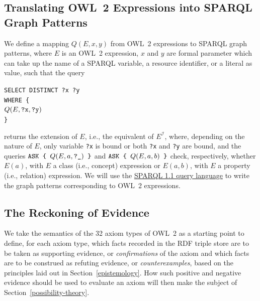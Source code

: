 \documentclass[a4paper]{article}
\newcounter{ex}
\begin{document}
\subsection{Translating OWL~2 Expressions into SPARQL Graph Patterns}

We define a mapping $Q(E, x, y)$ from OWL~2 expressions to SPARQL graph patterns,
where $E$ is an OWL~2 expression, $x$ and $y$ are formal parameter which can take up
the name of a SPARQL variable, a resource identifier, or a literal as value,
such that the query
\begin{tabbing}
\texttt{SELECT DISTINCT ?x ?y} \\
\texttt{WHERE \{}\\
\quad $Q(E, \mbox{\tt ?x}, \mbox{\tt ?y})$\\
\texttt{\}}
\end{tabbing}
returns the extension of $E$, i.e., the equivalent of $E^\mathcal{I}$, where,
depending on the nature of $E$, only variable \texttt{?x}
is bound or both \texttt{?x} and \texttt{?y} are bound,
and the queries $\mbox{\tt ASK \{ } Q(E, a, \mbox{\tt ?\_}) \mbox{\tt\ \}}$ and
$\mbox{\tt ASK \{ } Q(E, a, b) \mbox{\tt\ \}}$
check, respectively, whether $E(a)$, with $E$ a class (i.e., concept) expression or
$E(a, b)$, with $E$ a property (i.e., relation) expression.
We will use the \href{http://www.w3.org/TR/sparql11-query/}{SPARQL 1.1 query language}
to write the graph patterns corresponding to OWL~2 expressions.

\subsection{The Reckoning of Evidence}

We take the semantics of the 32 axiom types of OWL~2 as a starting point to define,
for each axiom type, which facts recorded in the RDF triple store are to be taken as
supporting evidence, or \emph{confirmations} of the axiom and which facts are to be
construed as refuting evidence, or \emph{counterexamples}, based on the principles
laid out in Section~\ref{epistemology}.
How such positive and negative evidence should be used to evaluate an axiom
will then make the subject of Section~\ref{possibility-theory}.
\end{document}
